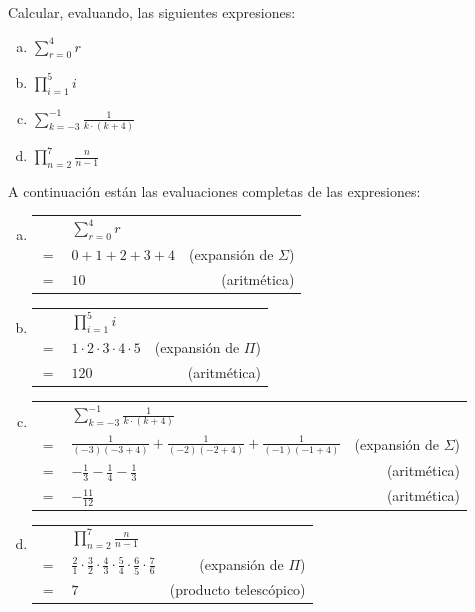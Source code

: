 \begin{problem}{}{}

    Calcular, evaluando, las siguientes expresiones:

    \begin{enumerate}[(a)]
        \item $\sum_{r=0}^{4} r$
        \item $\prod_{i=1}^{5} i$
        \item $\sum_{k=-3}^{-1} \frac{1}{k \cdot (k+4)}$
        \item $\prod_{n=2}^{7} \frac{n}{n-1}$
    \end{enumerate}

\end{problem}
\vspace{1ex}

A continuación están las evaluaciones completas de las expresiones:

\begin{enumerate}[(a)]
    \item \begin{tabular}{|l l r}
         & $\sum_{r=0}^{4} r$ & \\
        $=$ & $0 + 1 + 2 + 3 + 4$ & (expansión de $\Sigma$) \\
        $=$ & $10$ & (aritmética) \\
    \end{tabular}

    \item \begin{tabular}{|l l r}
         & $\prod_{i=1}^{5} i$ & \\
        $=$ & $1 \cdot 2 \cdot 3 \cdot 4 \cdot 5$ & (expansión de $\Pi$) \\
        $=$ & $120$ & (aritmética) \\
    \end{tabular}

    \item \begin{tabular}{|l l r}
         & $\sum_{k=-3}^{-1} \frac{1}{k \cdot (k+4)}$ & \\
        $=$ & $\frac{1}{(-3)(-3 + 4)} + \frac{1}{(-2)(-2 + 4)} + \frac{1}{(-1)(-1 + 4)}$ & (expansión de $\Sigma$) \\
        $=$ & $-\frac{1}{3} - \frac{1}{4} - \frac{1}{3}$ & (aritmética) \\
        $=$ & $-\frac{11}{12}$ & (aritmética) \\
    \end{tabular}

    \item \begin{tabular}{|l l r}
         & $\prod_{n=2}^{7} \frac{n}{n-1}$ & \\
        $=$ & $\frac21 \cdot \frac32 \cdot \frac43 \cdot \frac54 \cdot \frac65 \cdot \frac76$ & (expansión de $\Pi$) \\
        $=$ & $7$ & (producto telescópico) \\
    \end{tabular}
\end{enumerate}
